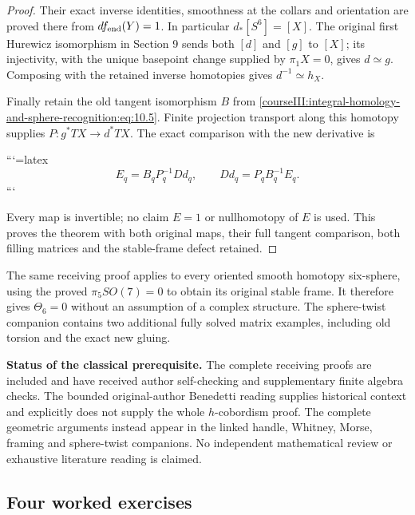 \begin{proof}
Their exact inverse identities, smoothness at the collars and orientation are proved there from \(df_{\rm end}(Y)=1\). In particular \(d_*[S^6]=[X]\). The original first Hurewicz isomorphism in Section 9 sends both \([d]\) and \([g]\) to \([X]\); its injectivity, with the unique basepoint change supplied by \(\pi_1X=0\), gives \(d\simeq g\). Composing with the retained inverse homotopies gives \(d^{-1}\simeq h_X\).

Finally retain the old tangent isomorphism \(B\) from \eqref{courseIII:integral-homology-and-sphere-recognition:eq:10.5}. Finite projection transport along this homotopy supplies \(P:g^*TX\to d^*TX\). The exact comparison with the new derivative is


```{=latex}
\begin{equation}
E_q=B_qP_q^{-1}Dd_q,\qquad Dd_q=P_qB_q^{-1}E_q .
 \label{courseIII:integral-homology-and-sphere-recognition:eq:10.11}
\end{equation}
```


Every map is invertible; no claim \(E=1\) or nullhomotopy of \(E\) is used. This proves the theorem with both original maps, their full tangent comparison, both filling matrices and the stable-frame defect retained.
\end{proof}

The same receiving proof applies to every oriented smooth homotopy six-sphere, using the proved \(\pi_5SO(7)=0\) to obtain its original stable frame. It therefore gives \(\Theta_6=0\) without an assumption of a complex structure. The sphere-twist companion contains two additional fully solved matrix examples, including old torsion and the exact new gluing.

\textbf{Status of the classical prerequisite.} The complete receiving proofs are included and have received author self-checking and supplementary finite algebra checks. The bounded original-author Benedetti reading supplies historical context and explicitly does not supply the whole \(h\)-cobordism proof. The complete geometric arguments instead appear in the linked handle, Whitney, Morse, framing and sphere-twist companions. No independent mathematical review or exhaustive literature reading is claimed.

\subsection{Four worked exercises}
\label{courseIII:integral-homology-and-sphere-recognition:solved-exercises}

